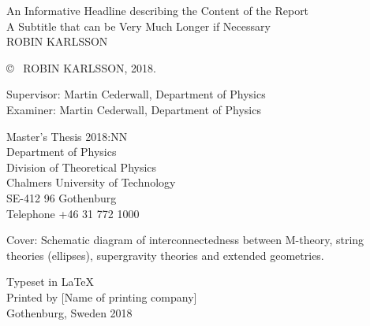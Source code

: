 \newpage
\thispagestyle{plain}
\vspace*{4.5cm}
An Informative Headline describing the Content of the Report\\
A Subtitle that can be Very Much Longer if Necessary\\
ROBIN KARLSSON \setlength{\parskip}{1cm}

\copyright ~ ROBIN KARLSSON, 2018. \setlength{\parskip}{1cm}

Supervisor: Martin Cederwall, Department of Physics\\
Examiner: Martin Cederwall, Department of Physics \setlength{\parskip}{1cm}

Master's Thesis 2018:NN\\	%
Department of Physics\\
Division of Theoretical Physics\\
Chalmers University of Technology\\
SE-412 96 Gothenburg\\
Telephone +46 31 772 1000 \setlength{\parskip}{0.5cm}

\vfill
Cover: Schematic diagram of interconnectedness between M-theory, string theories (ellipses), supergravity theories and extended geometries. \setlength{\parskip}{0.5cm}

Typeset in \LaTeX \\
Printed by [Name of printing company]\\
Gothenburg, Sweden 2018

